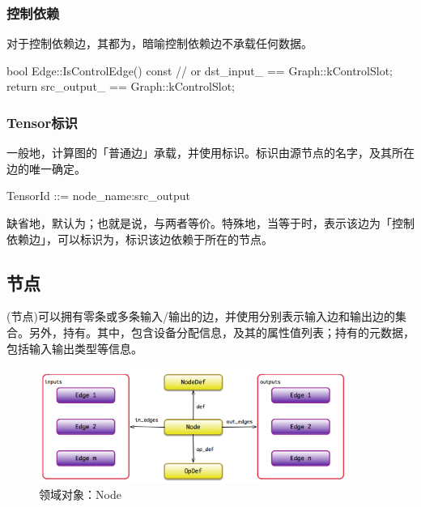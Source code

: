 \begin{content}
\subsubsection{控制依赖}

对于控制依赖边，其都为，暗喻控制依赖边不承载任何数据。

\begin{leftbar}
\begin{c++}
bool Edge::IsControlEdge() const {
   // or dst\_input\_ == Graph::kControlSlot;
   return src_output_ == Graph::kControlSlot;
}
\end{c++}
\end{leftbar}

\subsubsection{Tensor标识}

一般地，计算图的「普通边」承载，并使用标识。标识由源节点的名字，及其所在边的唯一确定。

\begin{leftbar}
\begin{c++}
TensorId ::= node_name:src_output
\end{c++}
\end{leftbar}

缺省地，默认为；也就是说，与两者等价。特殊地，当等于时，表示该边为「控制依赖边」，可以标识为，标识该边依赖于所在的节点。

\subsection{节点}

(节点)可以拥有零条或多条输入/输出的边，并使用分别表示输入边和输出边的集合。另外，持有。其中，包含设备分配信息，及其的属性值列表；持有的元数据，包括输入输出类型等信息。

\begin{figure}[!htbp]
\centering
\includegraphics[width=0.9\textwidth]{figures/cc-node-model.png}
\caption{领域对象：Node}
 \label{fig:cc-node-model}
\end{figure}


\end{content}
